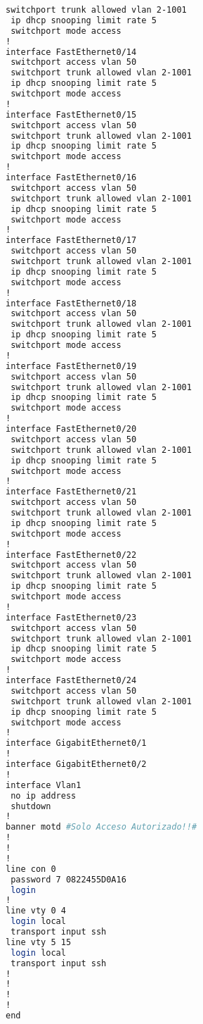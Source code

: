 \begin{lstlisting}[language=Bash, caption={Configuración Completa Switch Cardiologia}]
 switchport trunk allowed vlan 2-1001
 ip dhcp snooping limit rate 5
 switchport mode access
!
interface FastEthernet0/14
 switchport access vlan 50
 switchport trunk allowed vlan 2-1001
 ip dhcp snooping limit rate 5
 switchport mode access
!
interface FastEthernet0/15
 switchport access vlan 50
 switchport trunk allowed vlan 2-1001
 ip dhcp snooping limit rate 5
 switchport mode access
!
interface FastEthernet0/16
 switchport access vlan 50
 switchport trunk allowed vlan 2-1001
 ip dhcp snooping limit rate 5
 switchport mode access
!
interface FastEthernet0/17
 switchport access vlan 50
 switchport trunk allowed vlan 2-1001
 ip dhcp snooping limit rate 5
 switchport mode access
!
interface FastEthernet0/18
 switchport access vlan 50
 switchport trunk allowed vlan 2-1001
 ip dhcp snooping limit rate 5
 switchport mode access
!
interface FastEthernet0/19
 switchport access vlan 50
 switchport trunk allowed vlan 2-1001
 ip dhcp snooping limit rate 5
 switchport mode access
!
interface FastEthernet0/20
 switchport access vlan 50
 switchport trunk allowed vlan 2-1001
 ip dhcp snooping limit rate 5
 switchport mode access
!
interface FastEthernet0/21
 switchport access vlan 50
 switchport trunk allowed vlan 2-1001
 ip dhcp snooping limit rate 5
 switchport mode access
!
interface FastEthernet0/22
 switchport access vlan 50
 switchport trunk allowed vlan 2-1001
 ip dhcp snooping limit rate 5
 switchport mode access
!
interface FastEthernet0/23
 switchport access vlan 50
 switchport trunk allowed vlan 2-1001
 ip dhcp snooping limit rate 5
 switchport mode access
!
interface FastEthernet0/24
 switchport access vlan 50
 switchport trunk allowed vlan 2-1001
 ip dhcp snooping limit rate 5
 switchport mode access
!
interface GigabitEthernet0/1
!
interface GigabitEthernet0/2
!
interface Vlan1
 no ip address
 shutdown
!
banner motd #Solo Acceso Autorizado!!#
!
!
!
line con 0
 password 7 0822455D0A16
 login
!
line vty 0 4
 login local
 transport input ssh
line vty 5 15
 login local
 transport input ssh
!
!
!
!
end
\end{lstlisting}

